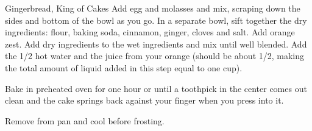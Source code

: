 \begin{entry}{Gingerbread, King of Cakes}
Add egg and molasses and mix, scraping down the sides and bottom of the bowl as
you go. In a separate bowl, sift together the dry ingredients: flour, baking
soda, cinnamon, ginger, cloves and salt. Add orange zest. Add dry ingredients to
the wet ingredients and mix until well blended. Add the \SI{1/2}{\cup} hot water
and the juice from your orange (should be about \SI{1/2}{\cup}, making the total
amount of liquid added in this step equal to one cup).

Bake in preheated oven for one hour or until a toothpick in the center comes out
clean and the cake springs back against your finger when you press into it.

Remove from pan and cool before frosting.
\end{entry}

